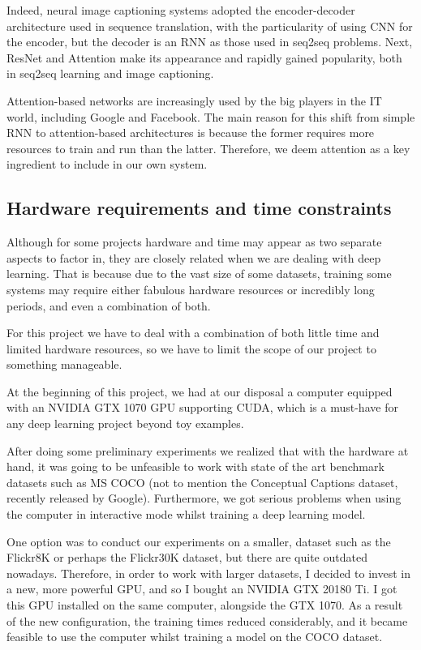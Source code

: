 Indeed, neural image captioning systems adopted the encoder-decoder architecture used in sequence translation, with the particularity of using CNN for the encoder, but the decoder is an RNN as those used in seq2seq problems. Next, ResNet and Attention make its appearance and rapidly gained popularity, both in seq2seq learning and image captioning.

Attention-based networks are increasingly used by the big players in the IT world, including Google and Facebook. The main reason for this shift from simple RNN to attention-based architectures is because the former requires more resources to train and run than the latter. Therefore, we deem attention as a key ingredient to include in our own system.

\subsection{Hardware requirements and time constraints}

Although for some projects hardware and time may appear as two separate aspects to factor in, they are closely related when we are dealing with deep learning. That is because due to the vast size of some datasets, training some systems may require either fabulous hardware resources or incredibly long periods, and even a combination of both.

For this project we have to deal with a combination of both little time and limited hardware resources, so we have to limit the scope of our project to something manageable.

At the beginning of this project, we had at our disposal a computer equipped with an NVIDIA GTX 1070 GPU supporting CUDA, which is a must-have for any deep learning project beyond toy examples.

After doing some preliminary experiments we realized that with the hardware at hand, it was going to be unfeasible to work with state of the art benchmark datasets such as MS COCO (not to mention the Conceptual Captions dataset, recently released by Google). Furthermore, we got serious problems when using the computer in interactive mode whilst training a deep learning model. 

One option was to conduct our experiments on a smaller, dataset such as the Flickr8K or perhaps the Flickr30K dataset, but there are quite outdated nowadays. Therefore, in order to work with larger datasets, I decided to invest in a new, more powerful GPU, and so I bought an NVIDIA GTX 20180 Ti. I got this GPU installed on the same computer, alongside the GTX 1070. As a result of the new configuration, the training times reduced considerably, and it became feasible to use the computer whilst training a model on the COCO dataset.

